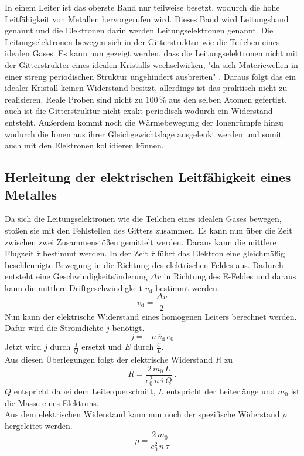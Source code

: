 In einem Leiter ist das oberste Band nur teilweise besetzt, wodurch die hohe Leitfähigkeit von Metallen hervorgerufen wird. Dieses Band wird Leitungsband genannt und die Elektronen darin werden Leitungselektronen genannt. Die Leitungselektronen bewegen sich in der Gitterstruktur wie die Teilchen eines idealen Gases. Es kann nun gezeigt werden, dass die Leitungselektronen nicht mit der Gitterstrukter eines idealen Kristalls wechselwirken, "da sich Materiewellen in einer streng periodischen Struktur ungehindert ausbreiten" \cite[2]{sample}. Daraus folgt das ein idealer Kristall keinen Widerstand besitzt, allerdings ist das praktisch nicht zu realisieren. Reale Proben sind nicht zu $100\,\%$ aus den selben Atomen gefertigt, auch ist die Gitterstruktur nicht exakt periodisch wodurch ein Widerstand entsteht. Außerdem kommt noch die Wärmebewegung der Ionenrümpfe hinzu wodurch die Ionen aus ihrer Gleichgewichtslage ausgelenkt werden und somit auch mit den Elektronen kollidieren können.


\subsection{Herleitung der elektrischen Leitfähigkeit eines Metalles}
Da sich die Leitungselektronen wie die Teilchen eines idealen Gases bewegen, stoßen sie mit den Fehlstellen des Gitters zusammen. Es kann nun über die Zeit zwischen zwei Zusammenstößen gemittelt werden. Daraus kann die mittlere Flugzeit $\overline{\tau}$ bestimmt werden. In der Zeit $\overline{\tau}$ führt das Elektron eine gleichmäßig beschleunigte Bewegung in die Richtung des elektrischen Feldes aus. Dadurch entsteht eine Geschwindigkeitsänderung $\Delta\overline{v}$ in Richtung des E-Feldes und daraus kann die mittlere Driftgeschwindigkeit $\overline{v}_\text{d}$ bestimmt werden.
\begin{equation}
	\overline{v}_\text{d} = \frac{\Delta\overline{v}}{2}
\end{equation}
Nun kann der elektrische Widerstand eines homogenen Leiters berechnet werden. Dafür wird die Stromdichte $j$ benötigt.
\begin{equation}
	j = -n\,\overline{v}_\text{d}\,e_0
	\label{eqn:j}
\end{equation}
Jetzt wird $j$ durch $\frac{I}{Q}$ ersetzt und $E$ durch $\frac{U}{L}$. \\
Aus diesen Überlegungen folgt der elektrische Widerstand $R$ zu
\begin{equation}
	R = \frac{2\,m_0\,L}{e_0^2\,n\,\overline{\tau}\,Q} \ .
	\label{eqn:R}
\end{equation}
$Q$ entspricht dabei dem Leiterquerschnitt, $L$ entspricht der Leiterlänge und $m_0$ ist die Masse eines Elektrons. \\
Aus dem elektrischen Widerstand kann nun noch der spezifische Widerstand $\rho$ hergeleitet werden.
\begin{equation}
	\rho = \frac{2\,m_0}{e_0^2\,n\,\overline{\tau}}
\end{equation}


